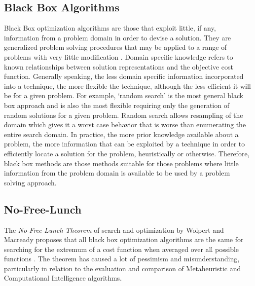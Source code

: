\begin{bibunit}
\subsection{Black Box Algorithms}
\label{subsec:black_box}
Black Box optimization algorithms are those that exploit little, if any, information from a problem domain in order to devise a solution. They are generalized problem solving procedures that may be applied to a range of problems with very little modification \cite{Droste2006}.
Domain specific knowledge refers to known relationships between solution representations and the objective cost function. Generally speaking, the less domain specific information incorporated into a technique, the more flexible the technique, although the less efficient it will be for a given problem. For example, `random search' is the most general black box approach and is also the most flexible requiring only the generation of random solutions for a given problem. Random search allows resampling of the domain which gives it a worst case behavior that is worse than enumerating the entire search domain. In practice, the more prior knowledge available about a problem, the more information that can be exploited by a technique in order to efficiently locate a solution for the problem, heuristically or otherwise. Therefore, black box methods are those methods suitable for those problems where little information from the problem domain is available to be used by a problem solving approach.  

% 
% 
\subsection{No-Free-Lunch}
\label{subsec:nfl}
The \emph{No-Free-Lunch Theorem} of search and optimization by Wolpert and Macready proposes that all black box optimization algorithms are the same for searching for the extremum of a cost function when averaged over all possible functions \cite{Wolpert1997, Wolpert1995}. The theorem has caused a lot of pessimism and misunderstanding, particularly in relation to the evaluation and comparison of Metaheuristic and Computational Intelligence algorithms.


\end{bibunit}
